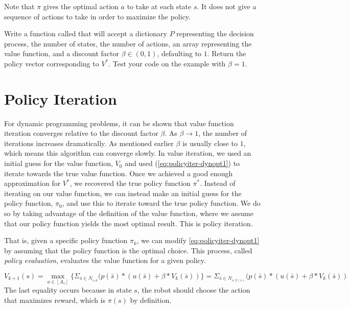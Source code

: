 \begin{info}
Note that $\pi$ gives the optimal action $a$ to take at each state $s$.
It does not give a sequence of actions to take in order to maximize the policy.
\end{info}

\begin{problem}
\label{prob:policyiter-value2}
Write a function called  that will accept a dictionary $P$ representing the decision process, the number of states, the number of actions, an array representing the value function, and a discount factor $\beta \in (0,1)$, defaulting to $1$.
Return the policy vector corresponding to $V^*$.
Test your code on the example with $\beta = 1$.
\end{problem}

\section*{Policy Iteration}
For dynamic programming problems, it can be shown that value function iteration converges relative to the discount factor $\beta$.
As $\beta\rightarrow1$, the number of iterations increases dramatically.
As mentioned earlier $\beta$ is usually close to $1$, which means this algorithm can converge slowly.
In value iteration, we used an initial guess for the value function, $V_0$ and used (\ref{eq:policyiter-dynopt1}) to iterate towards the true value function.
Once we achieved a good enough approximation for $V^*$, we recovered the true policy function $\pi^*$.
Instead of iterating on our value function, we can instead make an initial guess for the policy function, $\pi_0$, and use this to iterate toward the true policy function. 
We do so by taking advantage of the definition of the value function, where we assume that our policy function yields the most optimal result.
This is policy iteration.

That is, given a specific policy function $\pi_k$, we can modify \eqref{eq:policyiter-dynopt1} by assuming that the policy function is the optimal choice.
This process, called \emph{policy evaluation}, evaluates the value function for a given policy.

\begin{equation}
\label{eq:policyiter-val_from_policy}
V_{k+1}(s) = \max_{a \in [A_s]} \{\Sigma_{\bar{s}\in N_{s,a}}(p(\bar{s})*(u(\bar{s}) + \beta *V_{k}(\bar{s}))\} =  \Sigma_{\bar{s}\in N_{s,\pi(s)}}(p(\bar{s})*(u(\bar{s}) + \beta *V_{k}(\bar{s}))
\end{equation}
The last equality occurs because in state $s$, the robot should choose the action that maximizes reward, which is $\pi(s)$ by definition.


